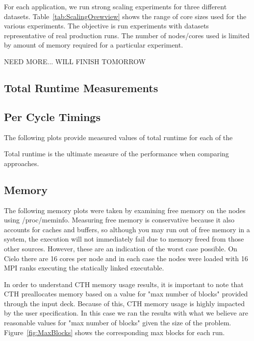 
For each application, we run strong scaling experiments for three different datasets.  
Table~\ref{tab:ScalingOvewview} shows the range of core sizes used for the various
experiments.  The objective is run experiments with datasets representative of real
production runs.  The number of nodes/cores used is limited by amount of memory required
for a particular experiment.  


NEED MORE... WILL FINISH TOMORROW


\subsection{Total Runtime Measurements}


\subsection{Per Cycle Timings}





The following plots provide measured values of total runtime for each of the 

Total runtime is the ultimate measure of the performance when comparing 
approaches.  


\subsection{Memory}
The following memory plots were taken by examining free memory on the nodes
using /proc/meminfo.  Measuring free memory is conservative because it also
accounts for caches and buffers, so although you may run out of free memory in
a system, the execution will not immediately fail due to memory freed from
those other sources.  However, these are an indication of the worst case
possible.  On Cielo there are 16 cores per node and in each case the nodes were
 loaded with 16 MPI ranks executing the statically linked executable.  

In order to understand CTH memory usage results, it is important to note that
CTH preallocates memory based on a value for "max number of blocks" provided
through the input deck.  Because of this, CTH memory usage is highly impacted
by the user specification.  In this case we ran the results with what we
believe are reasonable values for "max number of blocks" given the size of the
problem.  Figure~\ref{fig:MaxBlocks} shows the corresponding max blocks for
each run.

